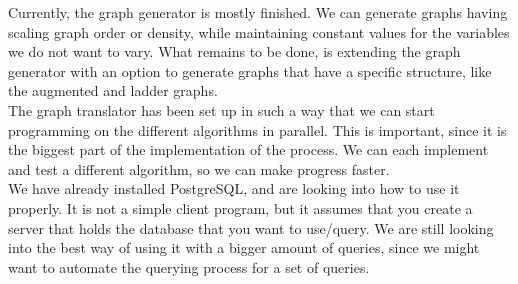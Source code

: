 Currently, the graph generator is mostly finished. We can generate graphs having scaling graph order or density, while maintaining constant values for the variables we do not want to vary. What remains to be done, is extending the graph generator with an option to generate graphs that have a specific structure, like the augmented and ladder graphs. \\

The graph translator has been set up in such a way that we can start programming on the different algorithms in parallel. This is important, since it is the biggest part of the implementation of the process. We can each implement and test a different algorithm, so we can make progress faster. \\

We have already installed PostgreSQL, and are looking into how to use it properly. It is not a simple client program, but it assumes that you create a server that holds the database that you want to use/query. We are still looking into the best way of using it with a bigger amount of queries, since we might want to automate the querying process for a set of queries.